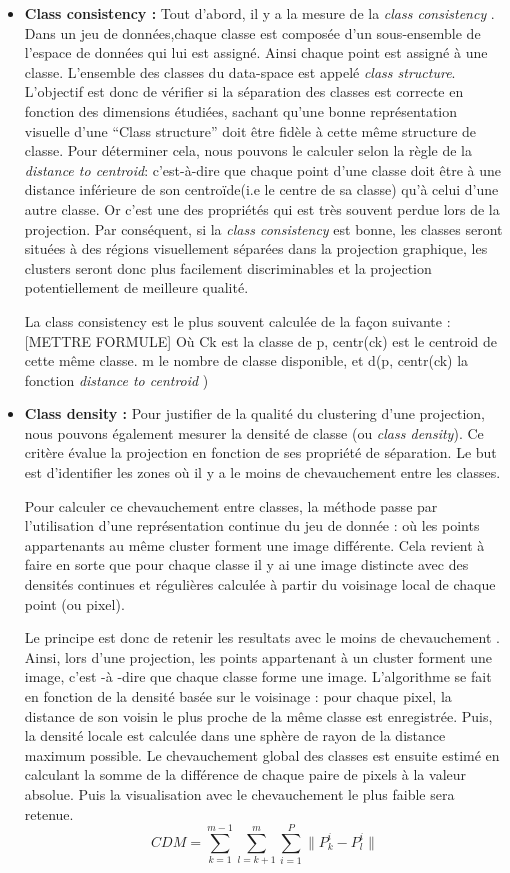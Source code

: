 \begin{itemize}
\item
\textbf{Class consistency : }
\smallskip
Tout d'abord, il y a la mesure de la \textit{class consistency} \cite{bertini2011Class-Consistency}.
 Dans un jeu de données,chaque classe est composée d’un sous-ensemble de l'espace de données qui lui est assigné. Ainsi
chaque point est assigné à une classe. L’ensemble des classes du data-space est appelé
\textit{class structure}.
L'objectif est donc de vérifier si la séparation des classes est correcte en fonction des
dimensions étudiées, sachant qu’une bonne représentation visuelle d’une “Class structure”
doit être fidèle à cette même structure de classe. Pour déterminer cela, nous pouvons le
calculer selon la règle de la \textit{distance to centroid}: c’est-à-dire que
chaque point d’une classe doit être à une distance inférieure de son centroïde(i.e le centre de sa
classe) qu’à celui d’une autre classe.
Or c’est une des propriétés qui est très souvent perdue lors de la projection.
Par conséquent, si la \textit{class consistency} est bonne, les classes seront situées à des régions
visuellement séparées dans la projection graphique, les clusters seront donc plus
facilement discriminables et la projection potentiellement de meilleure qualité.

La class consistency est le plus souvent calculée de la façon suivante : 
[METTRE FORMULE]
Où Ck est la classe de p, centr(ck) est le centroid de cette même classe. m le nombre de classe disponible, et d(p, centr(ck) la fonction \textit{distance to centroid} )
\item
\textbf{Class density : }
\smallskip
 Pour justifier de la qualité du clustering d’une projection, nous pouvons également
mesurer la densité de classe (ou \textit{class density}).
Ce critère évalue la projection en fonction de ses propriété de séparation. Le but est
d'identifier les zones où il y a le moins de chevauchement entre les classes.


Pour calculer ce chevauchement entre classes, la méthode passe par l'utilisation d'une représentation continue du jeu de donnée : où les points
appartenants au même cluster forment une image différente. Cela revient à faire en sorte que pour chaque classe il y ai une image distincte avec
des densités continues et régulières calculée à partir du voisinage local de chaque point (ou pixel).

Le principe est donc de retenir les resultats avec le moins de chevauchement \cite{AndradaTatu2010visual}.
Ainsi, lors d’une projection, les points appartenant à un cluster forment une image, c'est -à
-dire que chaque classe forme une image.
L’algorithme se fait en fonction de la densité basée sur le voisinage : pour chaque pixel, la
distance de son voisin le plus proche de la même classe est enregistrée. Puis, la densité
locale est calculée dans une sphère de rayon de la distance maximum possible.
Le chevauchement global des classes est ensuite estimé en calculant la somme de la
différence de chaque paire de pixels à la valeur absolue. Puis la visualisation avec le
chevauchement le plus faible sera retenue.
\[CDM =  \sum_{k=1}^{m-1} \sum_{l=k+1}^{m} \sum_{i=1}^{P} \lVert P_{k}^{i} - P_{l}^{i} \rVert \]



\end{itemize}
